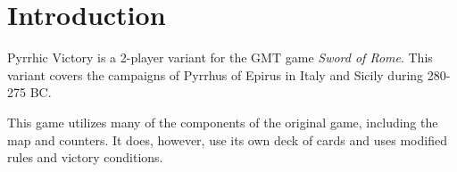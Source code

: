 \section{Introduction}

Pyrrhic Victory is a 2-player variant for the GMT game \textit{Sword of Rome}. This variant covers the campaigns of Pyrrhus of Epirus in Italy and Sicily during 280-275 BC.

This game utilizes many of the components of the original game, including the map and counters. It does, however, use its own deck of cards and uses modified rules and victory conditions.